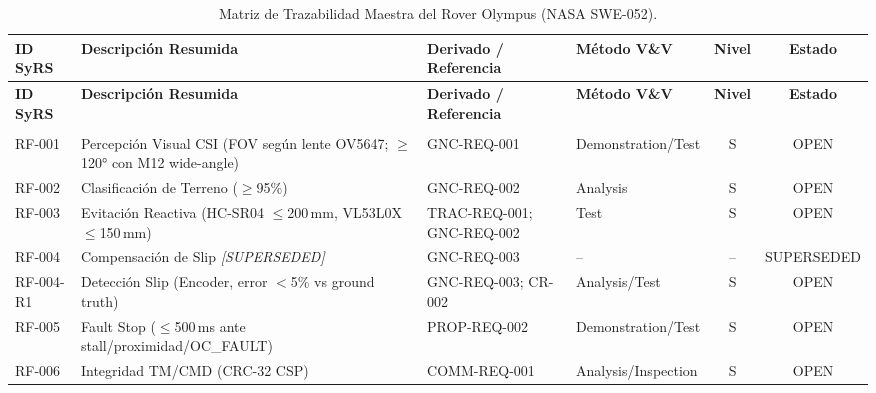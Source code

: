 \begin{landscape}
\centering
\scriptsize
\setlength{\tabcolsep}{3pt}
\renewcommand{\arraystretch}{1.3}
\begin{longtable}{| l | p{4.8cm} | p{3.6cm} | l | c | c |}
\caption{Matriz de Trazabilidad Maestra del Rover Olympus (NASA SWE-052).}\label{tab:rtm}\\
\hline
\textbf{ID SyRS} & \textbf{Descripción Resumida} & \textbf{Derivado / Referencia} & \textbf{Método V\&V} & \textbf{Nivel} & \textbf{Estado} \\ \hline
\endfirsthead
\hline
\textbf{ID SyRS} & \textbf{Descripción Resumida} & \textbf{Derivado / Referencia} & \textbf{Método V\&V} & \textbf{Nivel} & \textbf{Estado} \\ \hline
\endhead
\hline
\endfoot
\hline
\endlastfoot

\multicolumn{6}{|l|}{\textbf{Requisitos Funcionales de Sistema (RF)}} \\ \hline
RF-001 & Percepción Visual CSI (FOV según lente OV5647; $\ge$120° con M12 wide-angle) & GNC-REQ-001 & Demonstration/Test & S & OPEN \\
RF-002 & Clasificación de Terreno ($\ge$95\%) & GNC-REQ-002 & Analysis & S & OPEN \\
RF-003 & Evitación Reactiva (HC-SR04 $\le$200\,mm, VL53L0X $\le$150\,mm) & TRAC-REQ-001; GNC-REQ-002 & Test & S & OPEN \\
RF-004 & Compensación de Slip \textit{[SUPERSEDED]} & GNC-REQ-003 & -- & -- & SUPERSEDED \\
RF-004-R1 & Detección Slip (Encoder, error $<$5\% vs ground truth) & GNC-REQ-003; CR-002 & Analysis/Test & S & OPEN \\
RF-005 & Fault Stop ($\le$500\,ms ante stall/proximidad/OC\_FAULT) & PROP-REQ-002 & Demonstration/Test & S & OPEN \\
RF-006 & Integridad TM/CMD (CRC-32 CSP) & COMM-REQ-001 & Analysis/Inspection & S & OPEN \\ \hline


\end{longtable}
\end{landscape}
